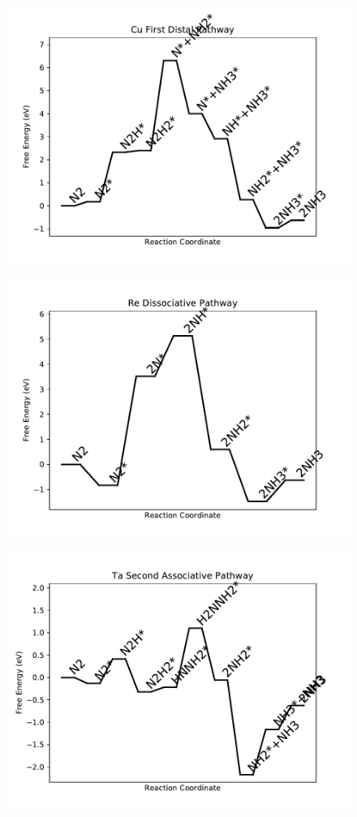 \begin{figure}
\includegraphics[width=0.8\linewidth]{data/plots/Cu_distal_1.pdf}
\end{figure}

\begin{figure}
\includegraphics[width=0.8\linewidth]{data/plots/Re_dissociative.pdf}
\end{figure}

\begin{figure}
\includegraphics[width=0.8\linewidth]{data/plots/Ta_associative_2.pdf}
\end{figure}

